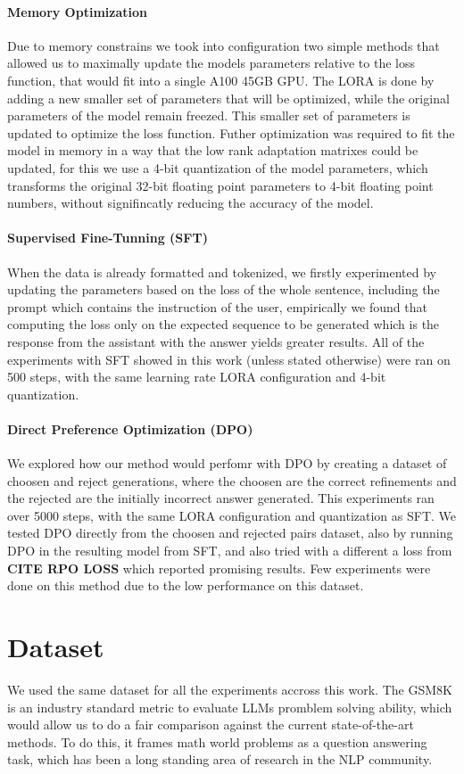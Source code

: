 \documentclass[a4paper,10pt]{article}
\begin{document}
\paragraph {Memory Optimization}
Due to memory constrains we took into configuration two simple methods that allowed us to maximally update the models parameters relative to the loss function, that would fit into a single A100 45GB GPU. The LORA is done by adding a new smaller set of parameters that will be optimized, while the original parameters of the model remain freezed. This smaller set of parameters is updated to optimize the loss function. Futher optimization was required to fit the model in memory in a way that the low rank adaptation matrixes could be updated, for this we use a 4-bit quantization of the model parameters, which transforms the original 32-bit floating point parameters to 4-bit floating point numbers, without signifincatly reducing the accuracy of the model. 
\paragraph{Supervised Fine-Tunning (SFT)}
When the data is already formatted and tokenized, we firstly experimented by updating the parameters based on the loss of the whole sentence, including the prompt which contains the instruction of the user, empirically we found that computing the loss only on the expected sequence to be generated which is the response from the assistant with the answer yields greater results. All of the experiments with SFT showed in this work (unless stated otherwise) were ran on 500 steps, with the same learning rate LORA configuration and 4-bit quantization.
\paragraph{Direct Preference Optimization (DPO)}
We explored how our method would perfomr with DPO by creating a dataset of choosen and reject generations, where the choosen are the correct refinements and the rejected are the initially incorrect answer generated. This experiments ran over 5000 steps, with the same LORA configuration and quantization as SFT. We tested DPO directly from the choosen and rejected pairs dataset, also by running DPO in the resulting model from SFT, and also tried with a different a loss from \textbf{CITE RPO LOSS} which reported promising results. Few experiments were done on this method due to the low performance on this dataset.

\section{Dataset}
We used the same dataset for all the experiments accross this work. The GSM8K is an industry standard metric to evaluate LLMs promblem solving ability, which would allow us to do a fair comparison against the current state-of-the-art methods. To do this, it frames math world problems as a question answering task, which has been a long standing area of research in the NLP community. 
\end{document}

